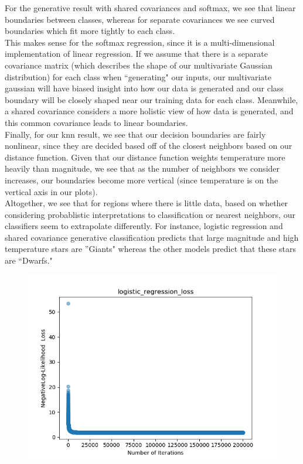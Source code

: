 \documentclass[submit]{harvardml}
\begin{document}
\begin{enumerate}
    For the generative result with shared covariances and softmax, we see that linear boundaries between classes, whereas for separate covariances we see curved boundaries which fit more tightly to each class. \\
    This makes sense for the softmax regression, since it is a multi-dimensional implementation of linear regression. If we assume that there is a separate covariance matrix (which describes the shape of our multivariate Gaussian distribution) for each class when ``generating" our inputs, our multivariate gaussian will have biased insight into how our data is generated and our class boundary will be closely shaped near our training data for each class. Meanwhile, a shared covariance considers a more holistic view of how data is generated, and this common covariance leads to linear boundaries. \\
    Finally, for our knn result, we see that our decision boundaries are fairly nonlinear, since they are decided based off of the closest neighbors based on our distance function. Given that our distance function weights temperature more heavily than magnitude, we see that as the number of neighbors we consider increases, our boundaries become more vertical (since temperature is on the vertical axis in our plots). \\
    Altogether, we see that for regions where there is little data, based on whether considering probablistic interpretations to classification or nearest neighbors, our classifiers seem to extrapolate differently. For instance, logistic regression and shared covariance generative classification predicts that large magnitude and high temperature stars are ''Giants" whereas the other models predict that these stars are ``Dwarfs."
    \begin{figure} [h!]
        \centering
        \includegraphics[height=0.4\textheight]{HW2/chosen_log_loss.png}

\end{figure}
\end{enumerate}
\end{document}
